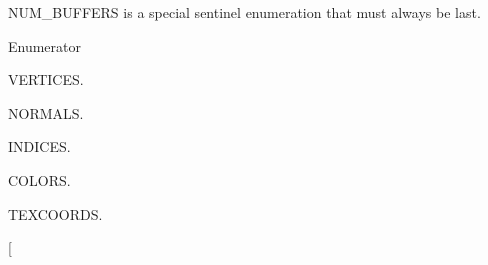 N\-U\-M\-\_\-\-B\-U\-F\-F\-E\-R\-S is a special sentinel enumeration that must always be last. \begin{Desc}
\item[Enumerator]\par
\begin{description}
\item[{\em 
\hypertarget{class_object_a74a39247838865244defd0ae9712df9ba23be05de1d4a9e5738eff4c1860f8bfd}{V\-E\-R\-T\-I\-C\-E\-S}\label{class_object_a74a39247838865244defd0ae9712df9ba23be05de1d4a9e5738eff4c1860f8bfd}
}]V\-E\-R\-T\-I\-C\-E\-S. \item[{\em 
\hypertarget{class_object_a74a39247838865244defd0ae9712df9bac91e7a2ef76150b999a9af53d229a8e0}{N\-O\-R\-M\-A\-L\-S}\label{class_object_a74a39247838865244defd0ae9712df9bac91e7a2ef76150b999a9af53d229a8e0}
}]N\-O\-R\-M\-A\-L\-S. \item[{\em 
\hypertarget{class_object_a74a39247838865244defd0ae9712df9babe6f0cf968db450f99d8e176c4d23091}{I\-N\-D\-I\-C\-E\-S}\label{class_object_a74a39247838865244defd0ae9712df9babe6f0cf968db450f99d8e176c4d23091}
}]I\-N\-D\-I\-C\-E\-S. \item[{\em 
\hypertarget{class_object_a74a39247838865244defd0ae9712df9ba69fb14c98b43d636b30ef5e77b492968}{C\-O\-L\-O\-R\-S}\label{class_object_a74a39247838865244defd0ae9712df9ba69fb14c98b43d636b30ef5e77b492968}
}]C\-O\-L\-O\-R\-S. \item[{\em 
\hypertarget{class_object_a74a39247838865244defd0ae9712df9badc601b2ac4ff7f3e455faa35208e431f}{T\-E\-X\-C\-O\-O\-R\-D\-S}\label{class_object_a74a39247838865244defd0ae9712df9badc601b2ac4ff7f3e455faa35208e431f}
}]T\-E\-X\-C\-O\-O\-R\-D\-S. \item[{\em 
}
\end{description}
\end{Desc}
